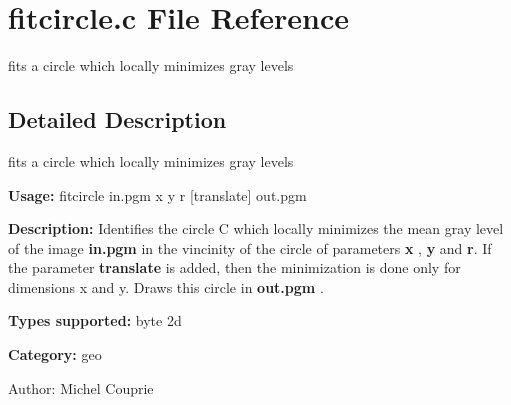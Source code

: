 \section{fitcircle.c File Reference}
\label{fitcircle_8c}
fits a circle which locally minimizes gray levels 



\subsection{Detailed Description}
fits a circle which locally minimizes gray levels 

{\bf Usage:} fitcircle in.pgm x y r [translate] out.pgm

{\bf Description:} Identifies the circle C which locally minimizes the mean gray level of the image {\bf in.pgm} in the vincinity of the circle of parameters {\bf x} , {\bf y} and {\bf r}. If the parameter {\bf translate} is added, then the minimization is done only for dimensions x and y. Draws this circle in {\bf out.pgm} .

{\bf Types supported:} byte 2d

{\bf Category:} geo

\begin{Desc}
\item[Author:]Michel Couprie \end{Desc}
